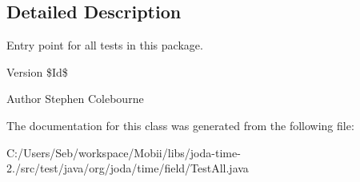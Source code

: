 \subsection{Detailed Description}
Entry point for all tests in this package.

\begin{DoxyVersion}{Version}
\$\-Id\$
\end{DoxyVersion}
\begin{DoxyAuthor}{Author}
Stephen Colebourne 
\end{DoxyAuthor}


The documentation for this class was generated from the following file\-:\begin{DoxyCompactItemize}
\item 
C\-:/\-Users/\-Seb/workspace/\-Mobii/libs/joda-\/time-\/2./src/test/java/org/joda/time/field/Test\-All.\-java\end{DoxyCompactItemize}
